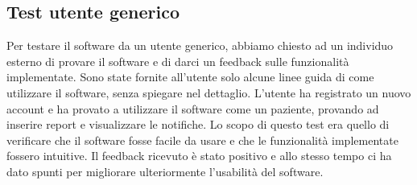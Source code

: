 \documentclass[a4paper]{article}
\begin{document}
\subsection{Test utente generico}

Per testare il software da un utente generico, abbiamo chiesto ad un individuo esterno di provare 
il software e di darci un feedback sulle funzionalità implementate.
Sono state fornite all'utente solo alcune linee guida di come utilizzare il software, senza spiegare nel dettaglio.
L'utente ha registrato un nuovo account e ha provato a utilizzare il software come un paziente,
provando ad inserire report e visualizzare le notifiche.
Lo scopo di questo test era quello di verificare che il software fosse facile da usare e che 
le funzionalità implementate fossero intuitive.
Il feedback ricevuto è stato positivo e allo stesso tempo ci ha dato spunti
per migliorare ulteriormente l'usabilità del software.
\end{document}
